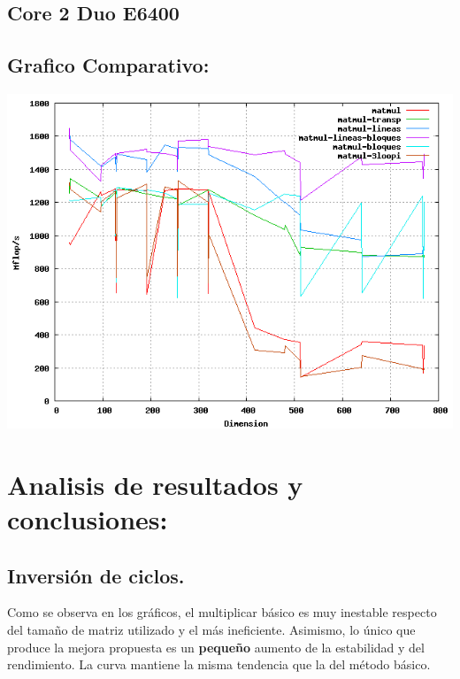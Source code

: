 \documentclass[a4paper,10pt]{article}
\begin{document}
\subsection{Core 2 Duo E6400}


\clearpage

\clearpage

\clearpage

\clearpage

\clearpage

\clearpage

\subsection{Grafico Comparativo: }

\includegraphics[width=15cm, bb=0 0 640 480]{core2-plot.png}
\clearpage

\section{Analisis de resultados y conclusiones: }

\subsection{Inversión de ciclos.}

Como se observa en los gráficos, el multiplicar básico es muy inestable respecto del tamaño de matriz utilizado y el más ineficiente. Asimismo, lo único que produce la mejora propuesta es un \textbf{pequeño} aumento de la estabilidad y del rendimiento. La curva mantiene la misma tendencia que la del método básico.
\end{document}
